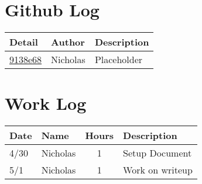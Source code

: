 \documentclass[letterpaper,10pt,fleqn,draftclsnofoot,onecolumn]{IEEEtran}
\begin{document}
	\section*{ Github Log }
	\begin{tabular}{l l p{1.5in}}\textbf{Detail} & \textbf{Author} & \textbf{Description}\\\hline
		\href{https://github.com/Skinnern/CS444/commit/9138e6857021329354027c49c35fea1604fd5585}{9138e68} & Nicholas & Placeholder\\\hline
	\end{tabular}
	
	
	\section*{Work Log}
	\begin{tabular}{l l c p{1.1in}}\textbf{Date} & \textbf{Name} & \textbf{Hours} & \textbf{Description}\\\hline
		4/30 & Nicholas & 1 & Setup Document\\\hline
		5/1 & Nicholas & 1 & Work on writeup\\\hline
	\end{tabular}
		
		\nocite{*}
		
		
	
\end{document}
